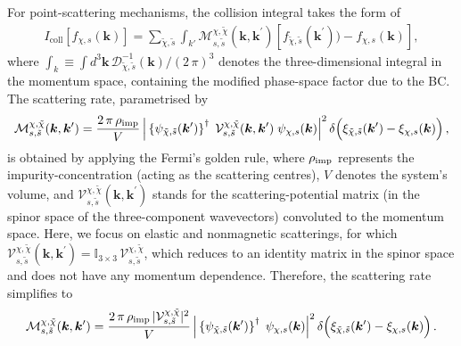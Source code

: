\documentclass[aps,prb,onecolumn,nofootinbib,citeautoscript,10pt]{revtex4-2}
\begin{document}
For point-scattering mechanisms, the collision integral takes the form of
\begin{align}
I_{\text{coll}} [f_{\chi, s}({\boldsymbol k})]
 = \sum \limits_{\tilde \chi, \tilde s}
\int_{k'}
\mathcal{M}^{\chi, \tilde \chi}_{ s, \tilde s} (\boldsymbol k,\boldsymbol k^\prime)
\left[ f_{\tilde \chi , \tilde s} ( \boldsymbol k^\prime))  - f_{\chi, s} (\boldsymbol k) \right ] ,
\end{align}
where $\int_k \equiv \int d^{3}  \boldsymbol k  \, {\mathcal D}^{-1}_{\tilde \chi, \tilde s} ({\boldsymbol k} )
/ (2\,\pi)^3 $ denotes the three-dimensional integral in the momentum space, containing the modified phase-space factor due to the BC.
The scattering rate, parametrised by
\begin{align}
\mathcal{M}^{\chi, \tilde \chi}_{ s, \tilde s} (\boldsymbol k,\boldsymbol k^\prime) 
= \frac{2\, \pi \, \rho_{\rm imp} } {V} \,
\Big \vert \left \lbrace  \psi_{ \tilde \chi, \tilde s }({ \boldsymbol k^\prime }) \right \rbrace^\dagger 
\; {\mathcal V} ^{\chi, \tilde \chi}_{ s, \tilde s} (\boldsymbol k,\boldsymbol k^\prime) 
  \;  \psi_{ \chi, s }({ \boldsymbol k}) \Big \vert^2 \,
 \delta \Big( \xi_{\tilde \chi , \tilde s } (\boldsymbol k^\prime)
 - \xi_{  \chi , s } (\boldsymbol k ) \Big) \,,
\end{align}
is obtained by applying the Fermi's golden rule, where $ \rho_{\rm imp}$ represents the impurity-concentration (acting as the scattering centres), $V$ denotes the system's volume, and ${\mathcal V} ^{\chi, \tilde \chi}_{ s, \tilde s} (\boldsymbol k,\boldsymbol k^\prime) $ stands for the scattering-potential matrix (in the spinor space of the three-component wavevectors) convoluted to the momentum space. Here, we focus on elastic and nonmagnetic scatterings, for which $ {\mathcal V} ^{\chi, \tilde \chi}_{ s, \tilde s} (\boldsymbol k,\boldsymbol k^\prime) 
=  \mathbb{I}_{3 \times 3} \, {\mathcal V} ^{\chi, \tilde \chi}_{ s, \tilde s} $, which reduces to an identity matrix in the spinor space and does not have any momentum dependence.
Therefore, the scattering rate simplifies to
\begin{align}
\mathcal{M}^{\chi, \tilde \chi}_{ s, \tilde s} (\boldsymbol k,\boldsymbol k^\prime) 
= \frac{2\, \pi \, \rho_{\rm imp} 
\, |{\mathcal V} ^{\chi, \tilde \chi}_{ s, \tilde s} |^2} 
{V} \,
\Big \vert \left \lbrace  \psi_{ \tilde \chi, \tilde s }({ \boldsymbol k^\prime }) \right \rbrace^\dagger 
\; \psi_{ \chi, s }({ \boldsymbol k}) \Big \vert^2 \,
 \delta \Big( \xi_{\tilde \chi , \tilde s } (\boldsymbol k^\prime)
 - \xi_{  \chi , s } (\boldsymbol k ) \Big) \,.
\end{align}
\end{document}
